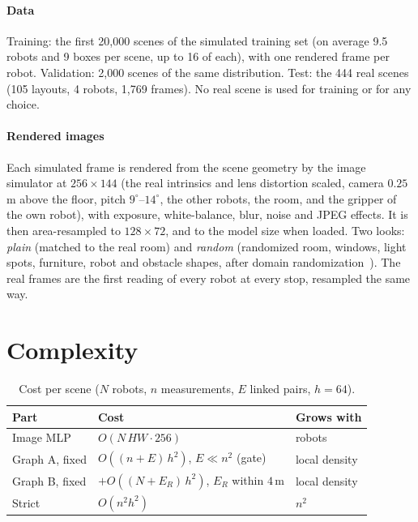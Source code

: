 \documentclass[conference]{IEEEtran}
\begin{document}
\paragraph{Data} Training: the first 20,000 scenes of the simulated training set (on average 9.5 robots and 9
boxes per scene, up to 16 of each), with one rendered frame per robot. Validation: 2,000 scenes of the same
distribution. Test: the 444 real scenes (105 layouts, 4 robots, 1,769 frames). No real scene is used for training
or for any choice.

\paragraph{Rendered images} Each simulated frame is rendered from the scene geometry by the image simulator at
$256\times144$ (the real intrinsics and lens distortion scaled, camera $0.25$\,m above the floor, pitch
$9^\circ$--$14^\circ$, the other robots, the room, and the gripper of the own robot), with exposure,
white-balance, blur, noise and JPEG effects. It is then area-resampled to $128\times72$, and to the model size when
loaded. Two looks: \emph{plain} (matched to the real room) and \emph{random} (randomized room, windows, light spots,
furniture, robot and obstacle shapes, after domain randomization~\cite{tobin2017}). The real frames are the first
reading of every robot at every stop, resampled the same way.

\section{Complexity}
\label{sec:scale}

\begin{table}[t]
\centering
\caption{Cost per scene ($N$ robots, $n$ measurements, $E$ linked pairs, $h=64$).}
\label{tab:cost}
\begin{tabular}{lll}
\toprule
Part & Cost & Grows with \\
\midrule
Image MLP & $O(N\,HW\cdot256)$ & robots \\
Graph A, fixed & $O((n+E)\,h^2)$, $E\ll n^2$ (gate) & local density \\
Graph B, fixed & $+O((N+E_R)\,h^2)$, $E_R$ within $4$\,m & local density \\
Strict & $O(n^2h^2)$ & $n^2$ \\
\bottomrule
\end{tabular}
\end{table}
\end{document}
